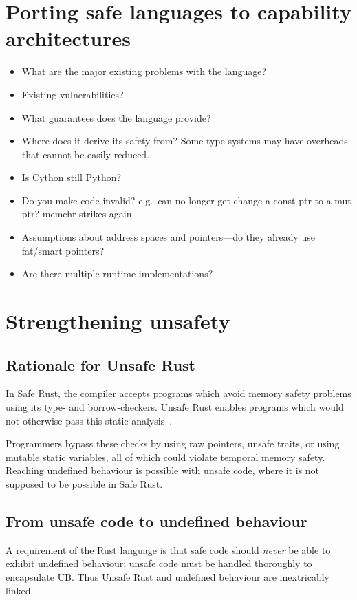 \documentclass[dissertation.tex]{subfiles}
\begin{document}
\section{Porting safe languages to capability architectures}
\label{sec:eval-othersafe}

\begin{itemize}
    \item What are the major existing problems with the language?
    \item Existing vulnerabilities?
    \item What guarantees does the language provide?
    \item Where does it derive its safety from? Some type systems may
    have overheads that cannot be easily reduced.
    \item Is Cython still Python?
    \item Do you make code invalid? e.g.\ can no longer get change a
    const ptr to a mut ptr? memchr strikes again
    \item Assumptions about address spaces and pointers---do they
    already use fat/smart pointers?
    \item Are there multiple runtime implementations?
\end{itemize}


\section{Strengthening unsafety}
\label{sec:eval-betterunsafe}

\subsection{Rationale for Unsafe Rust}
In Safe Rust, the compiler accepts programs which avoid memory safety
problems using its type- and borrow-checkers.
Unsafe Rust enables programs which would not otherwise pass this static
analysis~\cite{rust-trpl-book}.

Programmers bypass these checks by using raw pointers, unsafe traits, or
using mutable static variables, all of which could violate temporal
memory safety.
Reaching undefined behaviour is possible with unsafe code, where it is
not supposed to be possible in Safe Rust.


\subsection{From unsafe code to undefined behaviour}
A requirement of the Rust language is that safe code should \emph{never}
be able to exhibit undefined behaviour: unsafe code must be handled
thoroughly to encapsulate UB.
Thus Unsafe Rust and undefined behaviour are inextricably linked.
\end{document}
